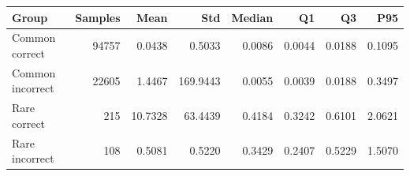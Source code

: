 \begin{tabular}{lrrrrrrr}
\toprule
Group & Samples & Mean & Std & Median & Q1 & Q3 & P95 \\
\midrule
Common correct & 94757 & 0.0438 & 0.5033 & 0.0086 & 0.0044 & 0.0188 & 0.1095 \\
Common incorrect & 22605 & 1.4467 & 169.9443 & 0.0055 & 0.0039 & 0.0188 & 0.3497 \\
Rare correct & 215 & 10.7328 & 63.4439 & 0.4184 & 0.3242 & 0.6101 & 2.0621 \\
Rare incorrect & 108 & 0.5081 & 0.5220 & 0.3429 & 0.2407 & 0.5229 & 1.5070 \\
\bottomrule
\end{tabular}
